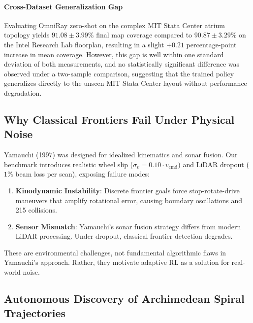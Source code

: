 \documentclass[11pt,a4paper]{article}
\begin{document}
\paragraph{Cross-Dataset Generalization Gap} Evaluating OmniRay zero-shot on the complex MIT Stata Center atrium topology yields $91.08 \pm 3.99\%$ final map coverage compared to $90.87 \pm 3.29\%$ on the Intel Research Lab floorplan, resulting in a slight $+0.21$ percentage-point increase in mean coverage. However, this gap is well within one standard deviation of both measurements, and no statistically significant difference was observed under a two-sample comparison, suggesting that the trained policy generalizes directly to the unseen MIT Stata Center layout without performance degradation.

\subsection{Why Classical Frontiers Fail Under Physical Noise}

Yamauchi (1997) was designed for idealized kinematics and sonar fusion. Our benchmark introduces realistic wheel slip ($\sigma_v = 0.10 \cdot v_{\text{cmd}}$) and LiDAR dropout ($1\%$ beam loss per scan), exposing failure modes:

\begin{enumerate}
    \item \textbf{Kinodynamic Instability}: Discrete frontier goals force stop-rotate-drive maneuvers that amplify rotational error, causing boundary oscillations and 215 collisions.
    \item \textbf{Sensor Mismatch}: Yamauchi's sonar fusion strategy differs from modern LiDAR processing. Under dropout, classical frontier detection degrades.
\end{enumerate}

These are environmental challenges, not fundamental algorithmic flaws in Yamauchi's approach. Rather, they motivate adaptive RL as a solution for real-world noise.

\subsection{Autonomous Discovery of Archimedean Spiral Trajectories}
\end{document}
